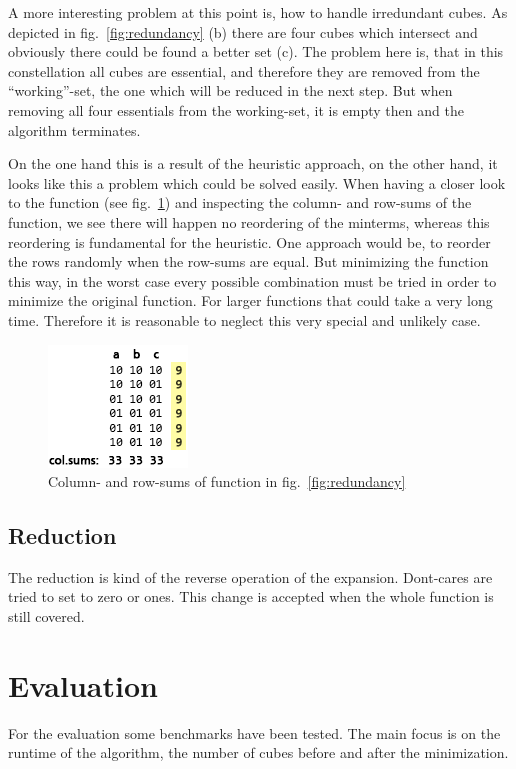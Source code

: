 \documentclass[colorback,accentcolor=tud1c,11pt]{tudreport}
\begin{document}
 A more interesting problem at this point is, how to handle irredundant cubes. As depicted in fig.~\ref{fig:redundancy} (b) there are four cubes which intersect and obviously there could be found a better set (c). The problem here is, that in this constellation all cubes are essential, and therefore they are removed from the ``working''-set, the one which will be reduced in the next step. But when removing all four essentials from the working-set, it is empty then and the algorithm terminates.
 \par
 On the one hand this is a result of the heuristic approach, on the other hand, it looks like this a problem which could be solved easily. When having a closer look to the function (see fig.~\ref{fig:redundancy2}) and inspecting the column- and row-sums of the function, we see there will happen no reordering of the minterms, whereas this reordering is fundamental for the heuristic. One approach would be, to reorder the rows randomly when the row-sums are equal. But minimizing the function this way, in the worst case every possible combination must be tried in order to minimize the original function. For larger functions that could take a very long time. Therefore it is reasonable to neglect this very special and unlikely case.

 \begin{figure}
   \centering
   \includegraphics{redundancy2}
   \caption{Column- and row-sums of function in fig.~\ref{fig:redundancy}}
   \label{fig:redundancy2}
 \end{figure}

 \section{Reduction}
 The reduction is kind of the reverse operation of the expansion. Dont-cares are tried to set to zero or ones. This change is accepted when the whole function is still covered.

 \chapter{Evaluation}
 For the evaluation some benchmarks have been tested. The main focus is on the runtime of the algorithm, the number of cubes before and after the minimization.
 

  
  
\end{document}
